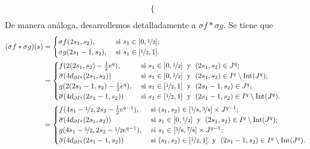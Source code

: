 \begin{dem}
\begin{align*}
\begin{cases}
        \end{cases}\\
    \end{align*}
    De manera análoga, desarrollemos detalladamente a $\sigma f*\sigma g$. Se tiene que
\begin{align*}
    (\sigma f*\sigma g)(s)&=\begin{cases}
            \sigma f(2s_1,s_2), & \text{ si } s_1\in [0,\nicefrac{1}{2}];\\
            \sigma g(2s_1-1,s_2), & \text{ si } s_1\in [\nicefrac{1}{2},1].
        \end{cases}\\
        &=\begin{cases}
            f(2(2s_1,s_2)-\frac{1}{2}e^q), & \text{ si } s_1\in [0,\nicefrac{1}{2}]\text{\; y\; } (2s_1,s_2)\in J^q;\\
            \overline{\sigma}(4d_{\partial I^q}(2s_1,s_2))
            & \text{ si } s_1\in [0,\nicefrac{1}{2}] \text{\; y\; } (2s_1,s_2)\in I^q\setminus\mathrm{Int}(J^q);\\
            g(2(2s_1-1,s_2)-\frac{1}{2}e^q), & \text{ si } s_1\in [\nicefrac{1}{2},1]\text{\; y\; } (2s_1-1,s_2)\in J^q;\\
            \overline{\sigma}(4d_{\partial I^q}(2s_1-1,s_2))
            & \text{ si } s_1\in [\nicefrac{1}{2},1] \text{\; y\; } (2s_1-1,s_2)\in I^q\setminus\mathrm{Int}(J^q).
        \end{cases}\\
        &=\begin{cases}
            f(4s_1-\nicefrac{1}{2},2s_2-\frac{1}{2}e^{q-1}), & \text{ si } (s_1,s_2)\in [\nicefrac{1}{8},\nicefrac{3}{8}]\times J^{q-1};\\
            \overline{\sigma}(4d_{\partial I^q}(2s_1,s_2))
            & \text{ si } s_1\in [0,\nicefrac{1}{2}] \text{\; y\; } (2s_1,s_2)\in I^q\setminus\mathrm{Int}(J^q);\\
            g(4s_1-\nicefrac{5}{2},2s_2-\nicefrac{1}{2}e^{q-1}), & \text{ si } s_1\in [\nicefrac{5}{8},\nicefrac{7}{8}]\times J^{q-1};\\
            \overline{\sigma}(4d_{\partial I^q}(2s_1-1,s_2))
            & \text{ si } (s_1,s_2)\in [\nicefrac{1}{2},1] \text{\; y\; } (2s_1-1,s_2)\in I^q\setminus\mathrm{Int}(J^q).
        \end{cases}
\end{align*}
    

\end{dem}
